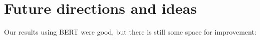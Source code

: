 \documentclass[fleqn,moreauthors,10pt]{ds_report}
\begin{document}

\section*{Future directions and ideas}
Our results using BERT were good, but there is still some space for improvement:
\end{document}
